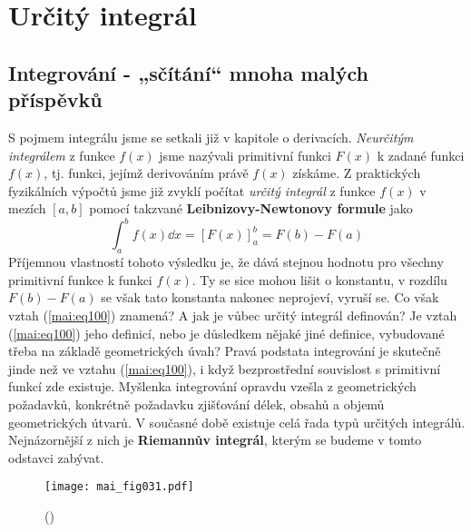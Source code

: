 \setchaptertoc
\chapter{Určitý integrál}\label{mai:IchapVIII}
  \section{Integrování - „sčítání“ mnoha malých příspěvků} 
    S pojmem integrálu jsme se setkali již v kapitole o derivacích. \emph{Neurčitým integrálem} z
    funkce \(f(x)\) jsme nazývali primitivní funkci \(F(x)\) k zadané funkci \(f(x)\), tj. funkci,
    jejímž derivováním právě \(f(x)\) získáme. Z praktických fyzikálních výpočtů jsme již zvyklí
    počítat \emph{určitý integrál} z funkce \(f(x)\) v mezích \([a, b]\) pomocí takzvané
    \textbf{Leibnizovy-Newtonovy formule} jako 
    \begin{equation}\label{mai:eq100}
      \int_a^bf(x)\dd{x} = [F(x)]_a^b = F(b) - F(a)
    \end{equation}
    Příjemnou vlastností tohoto výsledku je, že dává stejnou hodnotu pro všechny primitivní funkce k
    funkci \(f(x)\). Ty se sice mohou lišit o konstantu, v rozdílu \(F(b) - F(a)\) se však tato
    konstanta nakonec neprojeví, vyruší se. Co však vztah (\ref{mai:eq100}) znamená? A jak je vůbec
    určitý integrál definován? Je vztah (\ref{mai:eq100}) jeho definicí, nebo je důsledkem nějaké
    jiné definice, vybudované třeba na základě geometrických úvah? Pravá podstata integrování je
    skutečně jinde než ve vztahu (\ref{mai:eq100}), i když bezprostřední souvislost s primitivní
    funkcí zde existuje. Myšlenka integrování opravdu vzešla z geometrických požadavků, konkrétně
    požadavku zjišťování délek, obsahů a objemů geometrických útvarů. V současné době existuje celá
    řada typů určitých integrálů. Nejnázornější z nich je \textbf{Riemannův integrál}, kterým se
    budeme v tomto odstavci zabývat.



    \begin{figure}[ht!]  %
      \centering
      \texttt{[image: mai\_fig031.pdf]}
      \caption{
              (\cite[s.~10000]{Feynman01})}
      \label{mai:fig031}
    \end{figure}

